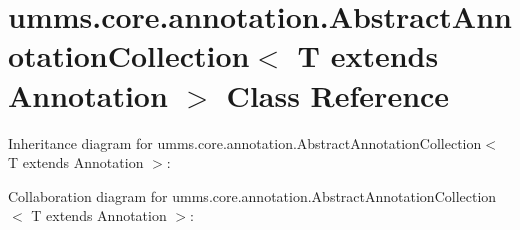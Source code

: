 \hypertarget{classumms_1_1core_1_1annotation_1_1_abstract_annotation_collection_3_01_t_01extends_01_annotation_01_4}{\section{umms.\+core.\+annotation.\+Abstract\+Annotation\+Collection$<$ T extends Annotation $>$ Class Reference}
\label{classumms_1_1core_1_1annotation_1_1_abstract_annotation_collection_3_01_t_01extends_01_annotation_01_4}
}


Inheritance diagram for umms.\+core.\+annotation.\+Abstract\+Annotation\+Collection$<$ T extends Annotation $>$\+:


Collaboration diagram for umms.\+core.\+annotation.\+Abstract\+Annotation\+Collection$<$ T extends Annotation $>$\+:
